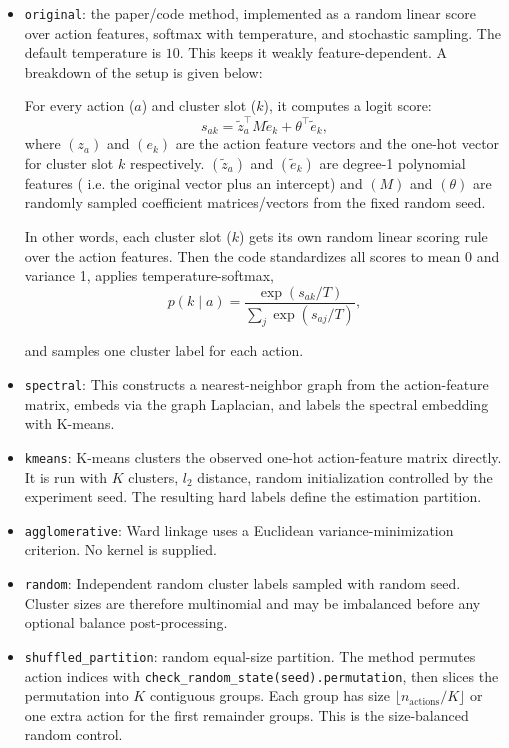 \documentclass[11pt]{article}
\begin{document}
\begin{itemize}
  \item \texttt{original}: the paper/code method, implemented as a random linear score over action features, softmax with temperature, and stochastic sampling. The default temperature is $10$. This keeps it weakly feature-dependent. A breakdown of the setup is given below: 

  For every action ($a$) and cluster slot ($k$), it computes a logit score: $$s_{ak} = \tilde z_a^\top M \tilde e_k +\theta^\top \tilde e_k,$$ where $(z_a)$ and $(e_k)$ are the action feature vectors and the one-hot vector for cluster slot $k$ respectively. $(\tilde z_a)$ and $(\tilde e_k)$ are degree-1 polynomial features ( i.e. the original vector plus an intercept) and $(M)$ and $(\theta)$ are randomly sampled coefficient matrices/vectors from the fixed random seed. 
  
  In other words, each cluster slot ($k$) gets its own random linear scoring rule over the action features. Then the code standardizes all scores to mean 0 and variance 1, applies temperature-softmax,
   $$p(k \mid a) = \frac{\exp(s_{ak}/T)}{\sum_j \exp(s_{aj}/T)},$$
   
   and samples one cluster label for each action.
  
  \item \texttt{spectral}: This constructs a nearest-neighbor graph from the action-feature matrix, embeds via the graph Laplacian, and labels the spectral embedding with K-means. 

   \item \texttt{kmeans}: K-means clusters the observed one-hot action-feature matrix directly. It is run with $K$ clusters, $l_2$ distance, random initialization controlled by the experiment seed. The resulting hard labels define the estimation partition. 

  \item \texttt{agglomerative}: Ward linkage uses a Euclidean variance-minimization criterion. No kernel is supplied. 

  \item \texttt{random}: Independent random cluster labels sampled with random seed. Cluster sizes
  are therefore multinomial and may be imbalanced before any optional balance post-processing.

  \item \texttt{shuffled\_partition}: random equal-size partition. The method permutes action indices with \texttt{check\_random\_state(seed).permutation}, then slices the permutation into $K$ contiguous groups. Each group has size $\lfloor n_{\mathrm{actions}}/K\rfloor$ or one extra action for the first remainder groups. This is the size-balanced random control.


\end{itemize}
\end{document}
